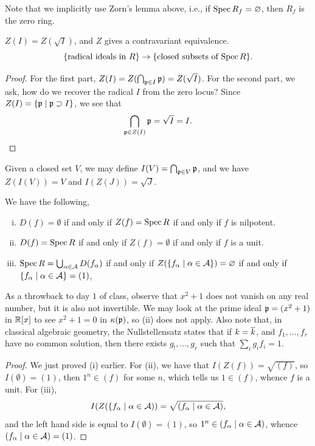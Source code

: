 {\color{airforceblue} Note that we implicitly use Zorn's lemma above, i.e., if $\operatorname{Spec} R_f = \varnothing$, then $R_f$ is the zero ring.}

\begin{theorem} \label{thm:Z_is_contravariant_equivalence}
    $Z(I) = Z(\sqrt I)$, and $Z$ gives a contravariant equivalence.
    \[ \{\text{radical ideals in $R$}\} \to \{\text{closed subsets of $\operatorname{Spec} R$}\}. \]
\end{theorem} \vspace{-6pt}
\begin{proof}
    For the first part, $Z(I) = Z(\bigcap_{\mathfrak p \in I} \mathfrak p) = Z(\sqrt I)$. For the second part, we ask, how do we recover the radical $I$ from the zero locus? Since $Z(I) = \{\mathfrak p \mid \mathfrak p \supset I\}$, we see that
    \[ \bigcap_{\mathfrak p \in Z(I)} \mathfrak p = \sqrt{I} = I. \qedhere \]
\end{proof} \vspace{-14pt}
Given a closed set $V$, we may define $I(V) = \bigcap_{\mathfrak p \in V} \mathfrak p$, and we have $Z(I(V)) = V$ and $I(Z(J)) = \sqrt{J}$.

\newpage
\begin{corollary} \label{cor:nilpotent_vanishing_locus}
    We have the following,
    \begin{enumerate}[(i)]
        \item $D(f) = \emptyset$ if and only if $Z(f) = \operatorname{Spec} R$ if and only if $f$ is nilpotent.
        \item $D(f) = \operatorname{Spec} R$ if and only if $Z(f) = \emptyset$ if and only if $f$ is a unit.
        \item $\operatorname{Spec} R = \bigcup_{\alpha \in \mathcal A} D(f_\alpha)$ if and only if $Z(\{f_\alpha \mid \alpha \in \mathcal A\}) = \varnothing$ if and only if $\{f_\alpha \mid \alpha \in \mathcal A\} = (1)$, 
    \end{enumerate}
\end{corollary}
As a throwback to day $1$ of class, observe that $x^2 + 1$ does not vanish on any real number, but it is also not invertible. We may look at the prime ideal $\mathfrak p = (x^2 + 1)$ in $\mathbb R[x]$ to see $x^2 + 1 = 0$ in $\kappa(\mathfrak p)$, so (ii) does not apply. Also note that, in classical algebraic geometry, the Nullstellensatz states that if $k = \overline k$, and $f_1, \dots, f_r$ have no common solution, then there exists $g_!, \dots, g_r$ such that $\sum_i g_i f_i = 1$.
\begin{proof}
    We just proved (i) earlier. For (ii), we have that $I(Z(f)) = \sqrt{(f)}$, so $I(\emptyset) = (1)$, then $1^n \in (f)$ for some $n$, which tells us $1 \in (f)$, whence $f$ is a unit. For (iii),
    \[ I(Z(\{f_\alpha \mid \alpha \in \mathcal A)) = \sqrt{(f_\alpha \mid \alpha \in \mathcal A)}, \]
    and the left hand side is equal to $I(\emptyset) = (1)$, so $1^n \in (f_\alpha \mid \alpha \in \mathcal A)$, whence $(f_\alpha \mid \alpha \in \mathcal A) = (1)$.
\end{proof}

